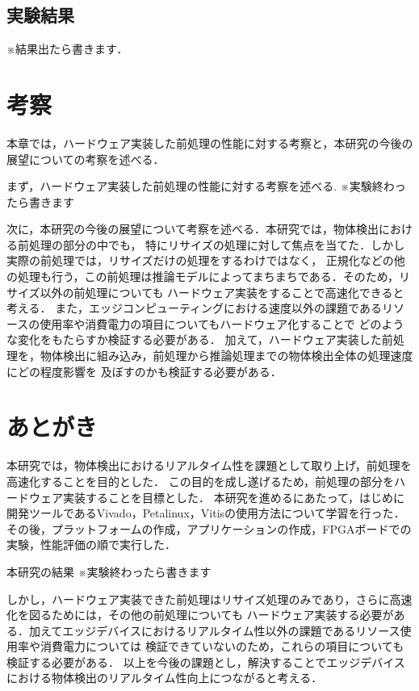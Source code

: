 \documentclass[11pt,a4j]{jreport}
\begin{document}
\section{実験結果}
※結果出たら書きます．
%
\chapter{考察}
本章では，ハードウェア実装した前処理の性能に対する考察と，本研究の今後の展望についての考察を述べる．

まず，ハードウェア実装した前処理の性能に対する考察を述べる.
※実験終わったら書きます

次に，本研究の今後の展望について考察を述べる．本研究では，物体検出における前処理の部分の中でも，
特にリサイズの処理に対して焦点を当てた．しかし実際の前処理では，リサイズだけの処理をするわけではなく，
正規化などの他の処理も行う，この前処理は推論モデルによってまちまちである．そのため，リサイズ以外の前処理についても
ハードウェア実装をすることで高速化できると考える．
また，エッジコンピューティングにおける速度以外の課題であるリソースの使用率や消費電力の項目についてもハードウェア化することで
どのような変化をもたらすか検証する必要がある．
加えて，ハードウェア実装した前処理を，物体検出に組み込み，前処理から推論処理までの物体検出全体の処理速度にどの程度影響を
及ぼすのかも検証する必要がある．
\chapter{あとがき}
本研究では，物体検出におけるリアルタイム性を課題として取り上げ，前処理を高速化することを目的とした．
この目的を成し遂げるため，前処理の部分をハードウェア実装することを目標とした．
本研究を進めるにあたって，はじめに開発ツールであるVivado，Petalinux，Vitisの使用方法について学習を行った．
その後，プラットフォームの作成，アプリケーションの作成，FPGAボードでの実験，性能評価の順で実行した．

本研究の結果
※実験終わったら書きます

しかし，ハードウェア実装できた前処理はリサイズ処理のみであり，さらに高速化を図るためには，その他の前処理についても
ハードウェア実装する必要がある．加えてエッジデバイスにおけるリアルタイム性以外の課題であるリソース使用率や消費電力については
検証できていないのため，これらの項目についても検証する必要がある．
以上を今後の課題とし，解決することでエッジデバイスにおける物体検出のリアルタイム性向上につながると考える．
\end{document}
